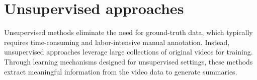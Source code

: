 \section{Unsupervised approaches} 
\label{section:rel-unsupervised} 

Unsupervised methods eliminate the need for ground-truth data, which typically requires time-consuming and labor-intensive manual annotation. Instead, unsupervised approaches leverage large collections of original videos for training. Through learning mechanisms designed for unsupervised settings, these methods extract meaningful information from the video data to generate summaries.







